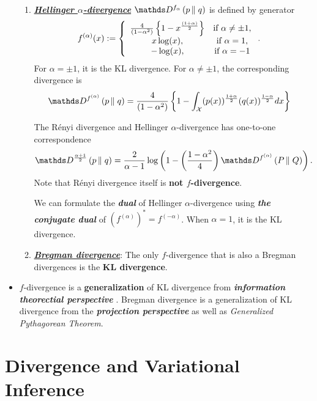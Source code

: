 \documentclass[11pt]{article}
\begin{document}
\begin{itemize}
\begin{enumerate}
\item  \underline{\emph{\textbf{Hellinger $\alpha$-divergence}}} $\divg{f_{\alpha}}{p}{q}$ is defined by generator 
\begin{align*}
f^{(\alpha)}(x) &:= \left\{ 
\begin{array}{cc}
\frac{4}{(1-\alpha^2)} \left\{1 - x^{\frac{(1+\alpha)}{2}}\right\}& \text{if}\ \alpha\neq \pm 1, \\
    x\log(x), & \text{if}\ \alpha=1, \\
    - \log(x), & \text{if}\ \alpha=-1
\end{array}
\right..
\end{align*} For $\alpha = \pm 1$, it is the KL divergence. For $\alpha \neq \pm 1$, the corresponding divergence is 
\begin{align}
\divg{f^{(\alpha)}}{p}{q} &=\frac{4}{(1-\alpha^2)}\set{1 - \int_{\cX}(p(x))^{\frac{1 + \alpha}{2}}  (q(x))^{\frac{1 - \alpha}{2}} dx } \label{eqn: hellinger_alpha_divergence}
\end{align}

The R\'enyi divergence and Hellinger $\alpha$-divergence has one-to-one correspondence
\begin{align*}
\divg{\frac{\alpha + 1}{2}}{p}{q} &= \frac{2}{\alpha - 1}\log\paren{1- \paren{\frac{1 - \alpha^2}{4}}\divg{f^{(\alpha)}}{P}{Q}}.
\end{align*} Note that R\'enyi divergence itself is \textbf{not $f$-divergence}.

We can formulate the \emph{\textbf{dual}} of Hellinger $\alpha$-divergence using \emph{\textbf{the conjugate dual}} of  $(f^{(\alpha)})^{*} = f^{(-\alpha)}$.  When $\alpha = 1$, it is the KL divergence.


\item  \underline{\emph{\textbf{Bregman divergence}}}:
The only $f$-divergence that is also a Bregman divergences is the \textbf{KL divergence}. 
\end{enumerate}


\item $f$-divergence is a \textbf{generalization} of  KL divergence from \emph{\textbf{information theorectial perspective}} \citep{thomas2006elements}. Bregman divergence is a generalization of KL divergence from the \emph{\textbf{projection perspective}} as well as \emph{Generalized Pythagorean Theorem}.
\end{itemize}

\section{Divergence and Variational Inference}
\newpage


\end{document}
